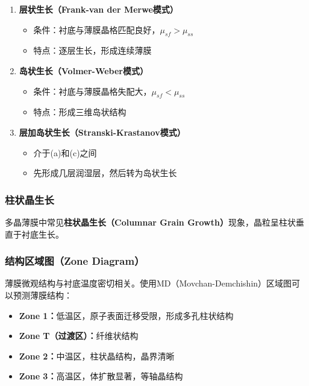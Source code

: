 \documentclass[UTF8,12pt,a4paper]{ctexart}
\begin{document}
\begin{enumerate}
    \item \textbf{层状生长（Frank-van der Merwe模式）}
    \begin{itemize}
        \item 条件：衬底与薄膜晶格匹配良好，$\mu_{sf} > \mu_{ss}$
        \item 特点：逐层生长，形成连续薄膜
    \end{itemize}
    
    \item \textbf{岛状生长（Volmer-Weber模式）}
    \begin{itemize}
        \item 条件：衬底与薄膜晶格失配大，$\mu_{sf} < \mu_{ss}$
        \item 特点：形成三维岛状结构
    \end{itemize}
    
    \item \textbf{层加岛状生长（Stranski-Krastanov模式）}
    \begin{itemize}
        \item 介于(a)和(c)之间
        \item 先形成几层润湿层，然后转为岛状生长
    \end{itemize}
\end{enumerate}

\subsubsection{柱状晶生长}

多晶薄膜中常见\textbf{柱状晶生长（Columnar Grain Growth）}现象，晶粒呈柱状垂直于衬底生长。

\subsubsection{结构区域图（Zone Diagram）}

薄膜微观结构与衬底温度密切相关。使用MD（Movchan-Demchishin）区域图可以预测薄膜结构：

\begin{itemize}
    \item \textbf{Zone 1：}低温区，原子表面迁移受限，形成多孔柱状结构
    \item \textbf{Zone T（过渡区）：}纤维状结构
    \item \textbf{Zone 2：}中温区，柱状晶结构，晶界清晰
    \item \textbf{Zone 3：}高温区，体扩散显著，等轴晶结构
\end{itemize}
\end{document}
